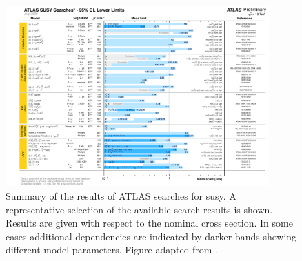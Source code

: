 \graphicspath{{chapter-results/Figs/Vector/}{chapter-results/Figs/}}


\begin{figure}
	\centering\includegraphics[width=0.9\textwidth]{susy_summary}
	\caption{Summary of the results of ATLAS searches for \gls{susy}. A representative selection of the available search results is shown. Results are given with respect to the nominal cross section. In some cases additional dependencies are indicated by darker bands showing different model parameters. Figure adapted from \cite{ATL-PHYS-PUB-2020-020}.}
	\label{fig:susy_summary_plot}
\end{figure}



